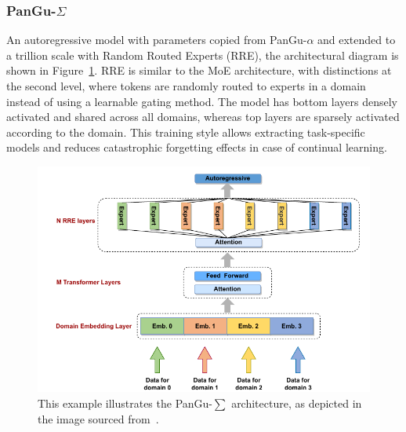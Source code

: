 \subsubsection{PanGu-$\Sigma$~\cite{PanGu_sigma}}
An autoregressive model with parameters copied from PanGu-$\alpha$ and extended to a trillion scale with Random Routed Experts (RRE), the architectural diagram is shown in Figure~\ref{pangu_sigma_image}. RRE is similar to the MoE architecture, with distinctions at the second level, where tokens are randomly routed to experts in a domain instead of using a learnable gating method. The model has bottom layers densely activated and shared across all domains, whereas top layers are sparsely activated according to the domain. This training style allows extracting task-specific models and reduces catastrophic forgetting effects in case of continual learning. 

\begin{figure}[tbp]
\centering
\includegraphics[width=1\columnwidth]{Figure/pangu_sigma.png}
\caption{This example illustrates the PanGu-$\sum$ architecture, as depicted in the image sourced from~\cite{PanGu_sigma}.}
\label{pangu_sigma_image}
\end{figure}


